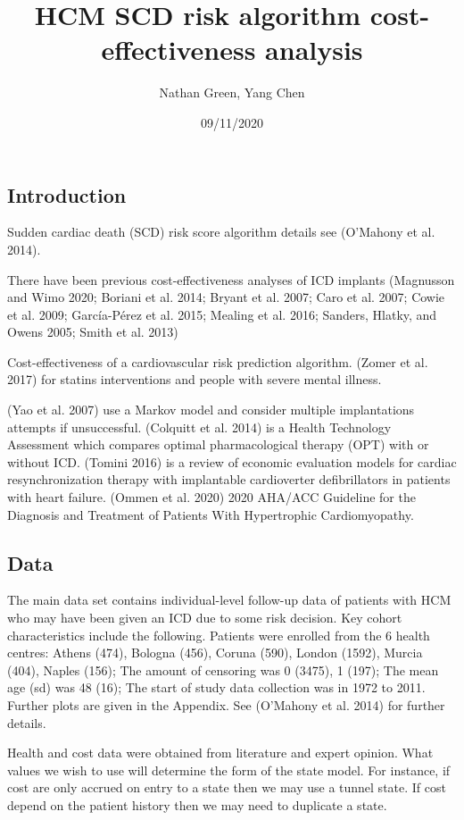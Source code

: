 \documentclass[
]{article}
\title{HCM SCD risk algorithm cost-effectiveness analysis}
\author{Nathan Green, Yang Chen}
\date{09/11/2020}
\begin{document}
\maketitle

\hypertarget{introduction}{%
\subsection{Introduction}\label{introduction}}

Sudden cardiac death (SCD) risk score algorithm details see (O'Mahony et al. 2014).

There have been previous cost-effectiveness analyses of ICD implants (Magnusson and Wimo 2020; Boriani et al. 2014; Bryant et al. 2007; Caro et al. 2007; Cowie et al. 2009; García-Pérez et al. 2015; Mealing et al. 2016; Sanders, Hlatky, and Owens 2005; Smith et al. 2013)

Cost-effectiveness of a cardiovascular risk prediction algorithm.
(Zomer et al. 2017) for statins interventions and people with severe mental illness.

(Yao et al. 2007) use a Markov model and consider multiple implantations attempts if unsuccessful.
(Colquitt et al. 2014) is a Health Technology Assessment which compares optimal pharmacological therapy (OPT) with or without ICD.
(Tomini 2016) is a review of economic evaluation models for cardiac resynchronization therapy with implantable cardioverter defibrillators in patients with heart failure.
(Ommen et al. 2020) 2020 AHA/ACC Guideline for the Diagnosis and Treatment of Patients With Hypertrophic Cardiomyopathy.

\hypertarget{data}{%
\subsection{Data}\label{data}}

The main data set contains individual-level follow-up data of patients with HCM who may have been given an ICD due to some risk decision.
Key cohort characteristics include the following.
Patients were enrolled from the 6 health centres: Athens (474), Bologna (456), Coruna (590), London (1592), Murcia (404), Naples (156); The amount of censoring was 0 (3475), 1 (197); The mean age (sd) was 48 (16); The start of study data collection was in 1972 to 2011. Further plots are given in the Appendix. See (O'Mahony et al. 2014) for further details.

Health and cost data were obtained from literature and expert opinion.
What values we wish to use will determine the form of the state model.
For instance, if cost are only accrued on entry to a state then we may use a tunnel state.
If cost depend on the patient history then we may need to duplicate a state.
\end{document}
